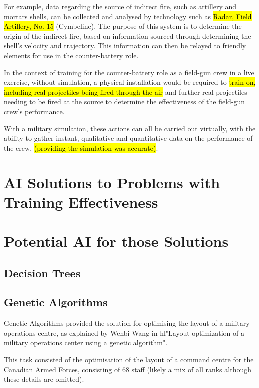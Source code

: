 \documentclass{article}
\begin{document}
For example, data regarding the source of indirect fire, such as artillery and mortars shells, can be collected and analysed by technology such as \hl{Radar, Field Artillery, No. 15} (Cymbeline). The purpose of this system is to determine the origin of the indirect fire, based on information sourced through determining the shell's velocity and trajectory. This information can then be relayed to friendly elements for use in the counter-battery role.

In the context of training for the counter-battery role as a field-gun crew in a live exercise, without simulation, a physical installation would be required to \hl{train on, including real projectiles being fired through the air} and further real projectiles needing to be fired at the source to determine the effectiveness of the field-gun crew's performance.

With a military simulation, these actions can all be carried out virtually, with the ability to gather instant, qualitative and quantitative data on the performance of the crew, \hl{(providing the simulation was accurate)}.

\section{AI Solutions to Problems with Training Effectiveness}



\section{Potential AI for those Solutions}

\subsection{Decision Trees}

\subsection{Genetic Algorithms}

Genetic Algorithms provided the solution for optimising the layout of a military operations centre, as explained by Wenbi Wang in hl{"Layout optimization of a military operations center using a genetic algorithm".}

This task consisted of the optimisation of the layout of a command centre for the Canadian Armed Forces, consisting of 68 staff (likely a mix of all ranks although these details are omitted).
\end{document}
